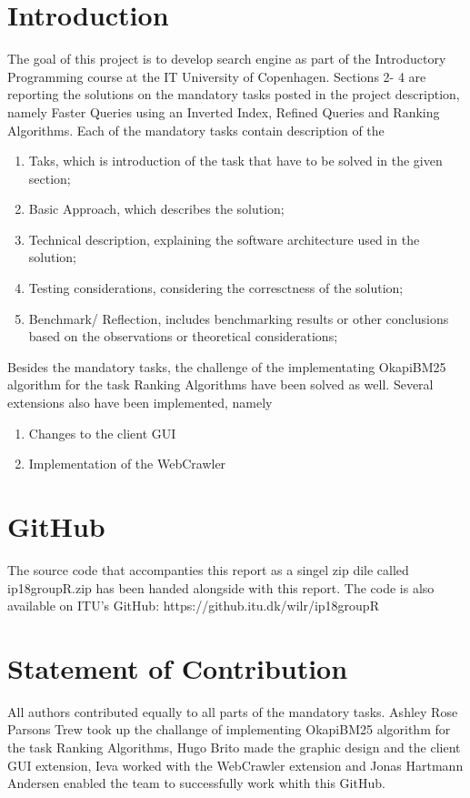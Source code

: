\section{Introduction}
\label{sec:Introduction}
The goal of this project is to develop search engine as part of the Introductory Programming course at the IT University of Copenhagen. Sections 2- 4 are reporting the solutions on the mandatory tasks posted in the project description, namely Faster Queries using an Inverted Index, Refined Queries and Ranking Algorithms. Each of the mandatory tasks contain description of the\\ 


\begin{enumerate}
\item Taks, which is introduction of the task that have to be solved in the given section;
\item Basic Approach, which describes the solution;
\item Technical description, explaining the software architecture used in the solution;
\item Testing considerations, considering the corresctness of the solution;
\item  Benchmark/ Reflection, includes benchmarking results or other conclusions based on the observations or theoretical considerations;
\end{enumerate}

Besides the mandatory tasks, the challenge of the implementating OkapiBM25 algorithm for the task Ranking Algorithms have been solved as well. Several extensions also have been implemented, namely


\begin{enumerate}
    \item Changes to the client GUI
    \item Implementation of the WebCrawler
\end{enumerate}


\section{GitHub}
\label{sec:GitHub}

The source code that accompanties this report as a singel zip dile called ip18groupR.zip has been handed alongside with this report. 
The code is also available on ITU's GitHub: https://github.itu.dk/wilr/ip18groupR

\section{Statement of Contribution}
\label{sec:Statement of Contribution}
All authors contributed equally to all parts of the mandatory tasks. Ashley Rose Parsons Trew took up the challange of implementing  OkapiBM25 algorithm for the task Ranking Algorithms, Hugo Brito made the graphic design and the client GUI extension, Ieva worked with the WebCrawler extension and Jonas Hartmann Andersen enabled the team to successfully work whith this GitHub. 
